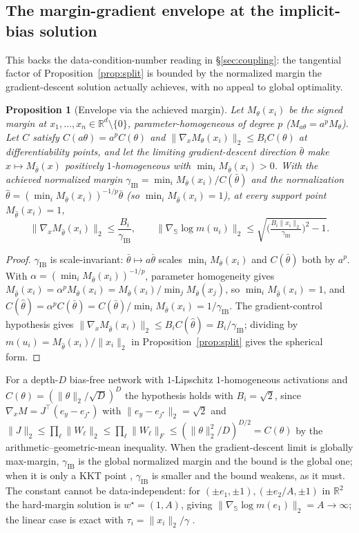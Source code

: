 \documentclass{article}
\newtheorem{proposition}{Proposition}
\theoremstyle{definition}
\newcommand{\R}{\mathbb{R}}
\newcommand{\dd}{d}
\begin{document}
\subsection{The margin-gradient envelope at the implicit-bias solution}\label{app:envelope}
This backs the data-condition-number reading in \S\ref{sec:coupling}: the tangential factor of Proposition~\ref{prop:split} is bounded by the normalized margin the gradient-descent solution actually achieves, with no appeal to global optimality.
\begin{proposition}[Envelope via the achieved margin]\label{prop:ib-envelope}
Let $M_\theta(x_i)$ be the signed margin at $x_1,\dots,x_n\in\R^\dd\setminus\{0\}$, parameter-homogeneous of degree $p$ ($M_{a\theta}=a^pM_\theta$). Let $C$ satisfy $C(a\theta)=a^pC(\theta)$ and $\|\nabla_x M_\theta(x_i)\|_2\le B_iC(\theta)$ at differentiability points, and let the limiting gradient-descent direction $\bar\theta$ make $x\mapsto M_{\bar\theta}(x)$ positively $1$-homogeneous with $\min_iM_{\bar\theta}(x_i)>0$. With the achieved normalized margin $\gamma_{\mathrm{IB}}=\min_iM_{\bar\theta}(x_i)/C(\bar\theta)$ and the normalization $\widehat\theta=(\min_iM_{\bar\theta}(x_i))^{-1/p}\bar\theta$ (so $\min_iM_{\widehat\theta}(x_i)=1$), at every support point $M_{\widehat\theta}(x_i)=1$,
\[
\|\nabla_x M_{\widehat\theta}(x_i)\|_2\le\frac{B_i}{\gamma_{\mathrm{IB}}},\qquad
\|\nabla_{\mathbb S}\log m(u_i)\|_2\le\sqrt{\Big(\tfrac{B_i\|x_i\|_2}{\gamma_{\mathrm{IB}}}\Big)^2-1}.
\]
\end{proposition}
\begin{proof}
$\gamma_{\mathrm{IB}}$ is scale-invariant: $\bar\theta\mapsto a\bar\theta$ scales $\min_iM_{\bar\theta}(x_i)$ and $C(\bar\theta)$ both by $a^p$. With $\alpha=(\min_iM_{\bar\theta}(x_i))^{-1/p}$, parameter homogeneity gives $M_{\widehat\theta}(x_i)=\alpha^pM_{\bar\theta}(x_i)=M_{\bar\theta}(x_i)/\min_jM_{\bar\theta}(x_j)$, so $\min_iM_{\widehat\theta}(x_i)=1$, and $C(\widehat\theta)=\alpha^pC(\bar\theta)=C(\bar\theta)/\min_iM_{\bar\theta}(x_i)=1/\gamma_{\mathrm{IB}}$. The gradient-control hypothesis gives $\|\nabla_x M_{\widehat\theta}(x_i)\|_2\le B_iC(\widehat\theta)=B_i/\gamma_{\mathrm{IB}}$; dividing by $m(u_i)=M_{\widehat\theta}(x_i)/\|x_i\|_2$ in Proposition~\ref{prop:split} gives the spherical form.
\end{proof}
For a depth-$D$ bias-free network with $1$-Lipschitz $1$-homogeneous activations and $C(\theta)=(\|\theta\|_2/\sqrt D)^D$ the hypothesis holds with $B_i=\sqrt2$, since $\nabla_x M=J^\top(e_y-e_{j^\star})$ with $\|e_y-e_{j^\star}\|_2=\sqrt2$ and $\|J\|_2\le\prod_\ell\|W_\ell\|_2\le\prod_\ell\|W_\ell\|_F\le(\|\theta\|_2^2/D)^{D/2}=C(\theta)$ by the arithmetic--geometric-mean inequality. When the gradient-descent limit is globally max-margin, $\gamma_{\mathrm{IB}}$ is the global normalized margin and the bound is the global one; when it is only a KKT point \citep{lyu2020gradient,ji2020directional,vardi2022margin}, $\gamma_{\mathrm{IB}}$ is smaller and the bound weakens, as it must. The constant cannot be data-independent: for $(\pm e_1,\pm1),(\pm e_2/A,\pm1)$ in $\R^2$ the hard-margin solution is $w^\star=(1,A)$, giving $\|\nabla_{\mathbb S}\log m(e_1)\|_2=A\to\infty$; the linear case is exact with $\tau_i=\|x_i\|_2/\gamma$ \citep{soudry2018implicit}.
\end{document}
